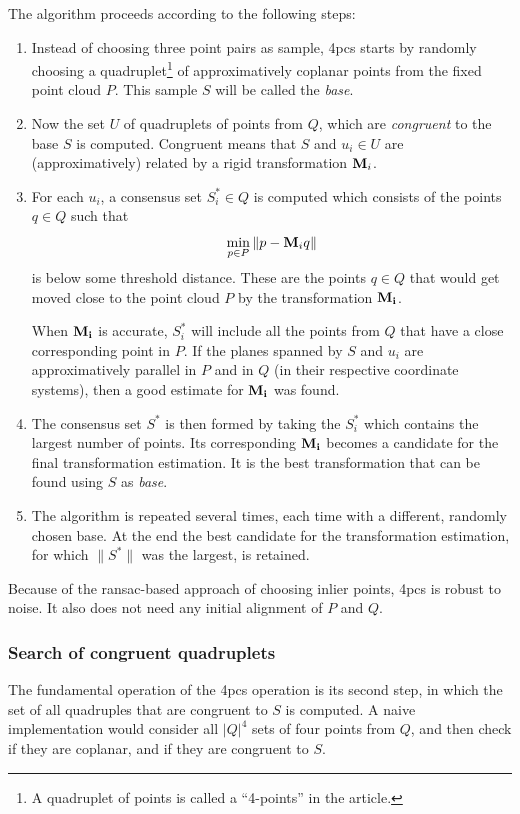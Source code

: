 The algorithm proceeds according to the following steps:
\begin{enumerate}
\item Instead of choosing three point pairs as sample, \gls{4pcs} starts by randomly choosing a quadruplet\footnote{A quadruplet of points is called a ``4-points'' in the article.} of approximatively coplanar points from the fixed point cloud $P$. This sample $S$ will be called the \emph{base}.

\item Now the set $U$ of quadruplets of points from $Q$, which are \emph{congruent} to the base $S$ is computed. Congruent means that $S$ and $u_i \in U$ are (approximatively) related by a rigid transformation $\mathbf{M}_i$.

\item For each $u_i$, a consensus set $S^{*}_i \in Q$ is computed which consists of the points $q \in Q$ such that
\begin{equation*}
\min_{p \in P} \| p - \mathbf{M}_i q \|
\end{equation*}
is below some threshold distance. These are the points $q \in Q$ that would get moved close to the point cloud $P$ by the transformation $\mathbf{M_i}$.

When $\mathbf{M_i}$ is accurate, $S^{*}_i$ will include all the points from $Q$ that have a close corresponding point in $P$. If the planes spanned by $S$ and $u_i$ are approximatively parallel in $P$ and in $Q$ (in their respective coordinate systems), then a good estimate for $\mathbf{M_i}$ was found.

\item The consensus set $S^{*}$ is then formed by taking the $S^{*}_i$ which contains the largest number of points. Its corresponding $\mathbf{M_i}$ becomes a candidate for the final transformation estimation. It is the best transformation that can be found using $S$ as \emph{base}. 

\item The algorithm is repeated several times, each time with a different, randomly chosen base. At the end the best candidate for the transformation estimation, for which $\| S^{*} \|$ was the largest, is retained.
\end{enumerate}


Because of the \gls{ransac}-based approach of choosing inlier points, \gls{4pcs} is robust to noise. It also does not need any initial alignment of $P$ and $Q$.


\subsubsection{Search of congruent quadruplets}
The fundamental operation of the \gls{4pcs} operation is its second step, in which the set of all quadruples that are congruent to $S$ is computed. A naive implementation would consider all $|Q|^4$ sets of four points from $Q$, and then check if they are coplanar, and if they are congruent to $S$.

